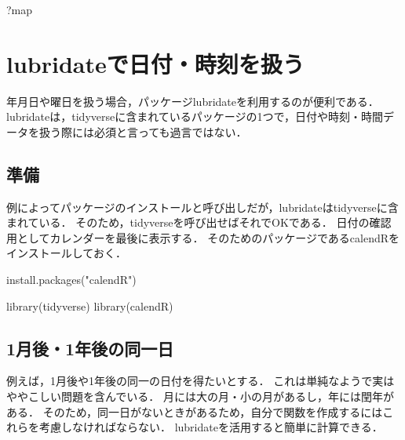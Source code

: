 \documentclass[
]{article}
\newenvironment{Shaded}{\begin{snugshade}}{\end{snugshade}}
\newcommand{\FunctionTok}[1]{\textcolor[rgb]{0.00,0.00,0.00}{#1}}
\newcommand{\NormalTok}[1]{#1}
\newcommand{\StringTok}[1]{\textcolor[rgb]{0.31,0.60,0.02}{#1}}
\begin{document}
\begin{Shaded}
\begin{Highlighting}[]
\NormalTok{?map}
\end{Highlighting}
\end{Shaded}

\hypertarget{lubridate}{%
\section{lubridateで日付・時刻を扱う}\label{lubridate}}

年月日や曜日を扱う場合，パッケージlubridateを利用するのが便利である．
lubridateは，tidyverseに含まれているパッケージの1つで，日付や時刻・時間データを扱う際には必須と言っても過言ではない．

\hypertarget{ux6e96ux5099-2}{%
\subsection{準備}\label{ux6e96ux5099-2}}

例によってパッケージのインストールと呼び出しだが，lubridateはtidyverseに含まれている．
そのため，tidyverseを呼び出せばそれでOKである．
日付の確認用としてカレンダーを最後に表示する．
そのためのパッケージであるcalendRをインストールしておく．

\begin{Shaded}
\begin{Highlighting}[]
\FunctionTok{install.packages}\NormalTok{(}\StringTok{"calendR"}\NormalTok{)}
\end{Highlighting}
\end{Shaded}

\begin{Shaded}
\begin{Highlighting}[]
\FunctionTok{library}\NormalTok{(tidyverse)}
\FunctionTok{library}\NormalTok{(calendR)}
\end{Highlighting}
\end{Shaded}

\hypertarget{ux6708ux5f8c1ux5e74ux5f8cux306eux540cux4e00ux65e5}{%
\subsection{1月後・1年後の同一日}\label{ux6708ux5f8c1ux5e74ux5f8cux306eux540cux4e00ux65e5}}

例えば，1月後や1年後の同一の日付を得たいとする．
これは単純なようで実はややこしい問題を含んでいる．
月には大の月・小の月があるし，年には閏年がある．
そのため，同一日がないときがあるため，自分で関数を作成するにはこれらを考慮しなければならない．
lubridateを活用すると簡単に計算できる．
\end{document}
